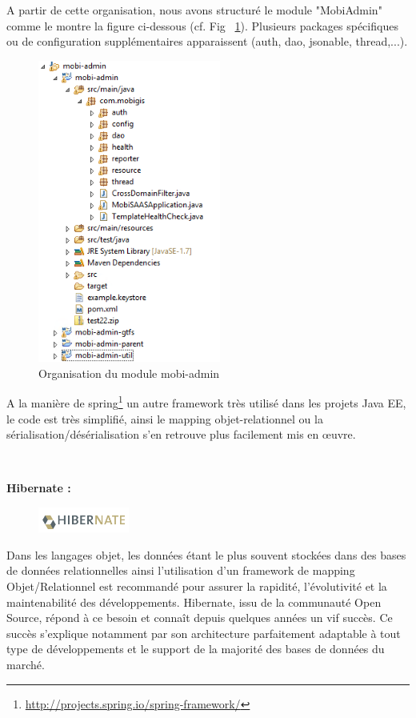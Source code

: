 \begin{itemize}
A partir de cette organisation, nous avons structuré le module "MobiAdmin" comme le montre la figure ci-dessous (cf. Fig ~\ref{Organisation_MobiAdmin}). 
Plusieurs packages spécifiques ou de configuration supplémentaires apparaissent (auth, dao, jsonable, thread,...). 
\\
\begin{figure}[h]
\centering
\includegraphics[width=6cm,heigth=6cm]{images/Package_explorer_MobiSAAS.PNG}
\caption{\label{Organisation_MobiAdmin}Organisation du module mobi-admin}
\end{figure} 


A la manière de spring\footnote{\url{http://projects.spring.io/spring-framework/}} un autre framework très utilisé dans les projets Java EE, le code est très simplifié, ainsi le mapping objet-relationnel ou la sérialisation/désérialisation s'en retrouve plus facilement mis en \oe uvre.

\\
\pagebreak

\textbf{Hibernate :}

\begin{figure}
\centering
\includegraphics[width=3cm]{images/hibernate.png}
\end{figure}
\noindent Dans les langages objet, les données étant le plus souvent stockées dans des bases de données relationnelles ainsi l'utilisation d'un framework de mapping Objet/Relationnel est recommandé pour assurer la rapidité, l'évolutivité et la maintenabilité des développements. Hibernate, issu de la communauté Open Source, répond à ce besoin et connaît depuis quelques années un vif succès. Ce succès s'explique notamment par son architecture parfaitement adaptable à tout type de développements et le support de la majorité des bases de données du marché.\\


\end{itemize}
